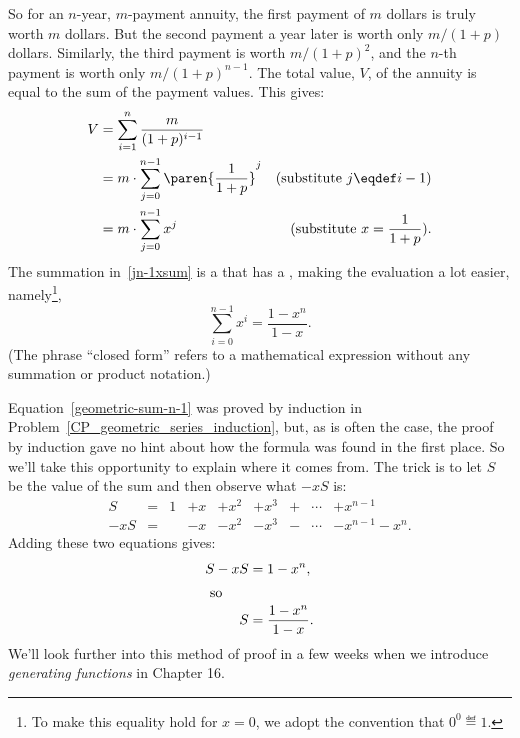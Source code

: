 So for an $n$-year, $m$-payment annuity, the first payment of $m$ dollars
is truly worth $m$ dollars.  But the second payment a year later is worth
only $m/(1+p)$ dollars.  Similarly, the third payment is worth
$m/(1+p)^2$, and the $n$-th payment is worth only $m/(1+p)^{n-1}$.  The
total value, $V$, of the annuity is equal to the sum of the payment
values.  This gives:
\begin{align}
  V & = \sum_{i=1}^n \frac{m}{(1+p)^{i-1}}\notag\\
  & = m \cdot \sum_{j=0}^{n-1} \paren{\frac{1}{1+p}}^j 
          & \text{(substitute $j \eqdef i-1$)}\notag\\
  & = m \cdot \sum_{j=0}^{n-1} x^j
          & (\mbox{substitute } x = \frac{1}{1+p}).\label{jn-1xsum}
\end{align}
The summation in~\eqref{jn-1xsum} is a  that has a
, making the evaluation a lot easier, namely\footnote{To
  make this equality hold for $x=0$, we adopt the convention that $0^0
  \eqdef 1$.},
\begin{equation}\label{geometric-sum-n-1}
\sum_{i=0}^{n-1} x^i = \frac{1- x^n}{1 - x}.
\end{equation}
(The phrase ``closed form'' refers to a mathematical expression without
any summation or product notation.)

Equation~\eqref{geometric-sum-n-1} was proved by induction in
Problem~\ref{CP_geometric_series_induction}, but, as is often the case,
the proof by induction gave no hint about how the formula was found in the
first place.  So we'll take this opportunity to explain where it comes
from.  The trick is to let $S$ be the value of the sum and then observe
what $-xS$ is:
\[\begin{array}{rclllllcl}
  S & = & 1 & +  x & + x^2 & + x^3 & + &\cdots & + x^{n-1} \\
-xS & = &   & -  x & - x^2 & - x^3 & - &\cdots & - x^{n-1} - x^{n}.
\end{array}\]
Adding these two equations gives:
\begin{align*}
S-xS  & =  1 - x^n, \\
\intertext{  so}
S     & = \frac{1 - x^n}{1 - x}.
\end{align*}
We'll look further into this method of proof in a few weeks when we
introduce \emph{generating functions} in 
Chapter 16.%


